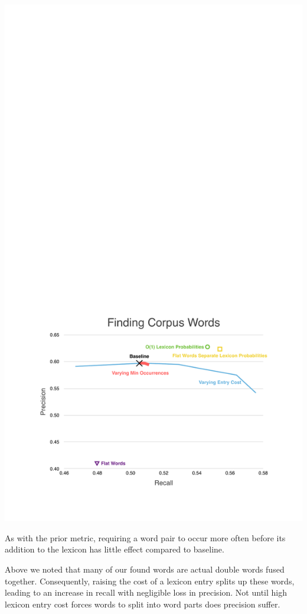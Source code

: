 \documentclass[11pt, oneside, fleqn]{article}
\begin{document}
  \includegraphics[scale=0.9]{./figure/finding_corpus_word.pdf}

    As with the prior metric, requiring a word pair to occur more often before its addition to the lexicon has little effect compared to baseline.

	Above we noted that many of our found words are actual double words fused together. Consequently, raising the cost of a lexicon entry splits up these words, leading to an increase in recall with negligible loss in precision. Not until high lexicon entry cost forces words to split into word parts does precision suffer.
\end{document}
